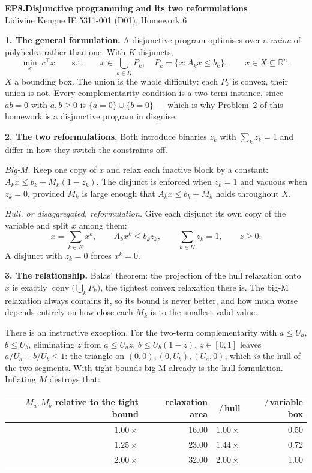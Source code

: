 \documentclass[10pt]{article}
\DeclareMathOperator{\conv}{conv}
\newcommand{\T}{^{\!\top}}
\begin{document}
{\large\bfseries EP8.\quad Disjunctive programming and its two reformulations}\\[1pt]
{\small Lidivine Kengne \quad\textbar\quad IE 5311-001 (D01), Homework 6}
\vspace{0.3em}

\textbf{1. The general formulation.}
A disjunctive program optimises over a \emph{union} of polyhedra rather
than one. With $K$ disjuncts,
\[
  \min_{x}\; c\T x
  \qquad\text{s.t.}\qquad
  x \in \bigcup_{k \in K} P_k, \quad P_k = \{x : A_k x \le b_k\},
  \qquad x \in X \subseteq \mathbb{R}^n,
\]
$X$ a bounding box. The union is the whole difficulty: each $P_k$ is
convex, their union is not. Every complementarity condition is a
two-term instance, since $ab = 0$ with $a,b \ge 0$ is
$\{a = 0\} \cup \{b = 0\}$ --- which is why Problem~2 of this homework
is a disjunctive program in disguise.

\textbf{2. The two reformulations.}
Both introduce binaries $z_k$ with $\sum_k z_k = 1$ and differ in how
they switch the constraints off.

\emph{Big-M.} Keep one copy of $x$ and relax each inactive block by a
constant: $A_k x \le b_k + M_k(1 - z_k)$. The disjunct is enforced when
$z_k = 1$ and vacuous when $z_k = 0$, provided $M_k$ is large enough
that $A_k x \le b_k + M_k$ holds throughout $X$.

\emph{Hull, or disaggregated, reformulation.} Give each disjunct its
own copy of the variable and split $x$ among them:
\[
  x = \sum_{k \in K} x^k, \qquad
  A_k x^k \le b_k z_k, \qquad
  \sum_{k \in K} z_k = 1, \qquad z \ge 0 .
\]
A disjunct with $z_k = 0$ forces $x^k = 0$.

\textbf{3. The relationship.}
Balas' theorem: the projection of the hull relaxation onto $x$ is
exactly $\conv\bigl(\bigcup_k P_k\bigr)$, the tightest convex
relaxation there is. The big-M relaxation always contains it, so its
bound is never better, and how much worse depends entirely on how close
each $M_k$ is to the smallest valid value.

There is an instructive exception. For the two-term complementarity
with $a \le U_a$, $b \le U_b$, eliminating $z$ from $a \le U_a z$,
$b \le U_b(1-z)$, $z \in [0,1]$ leaves $a/U_a + b/U_b \le 1$: the
triangle on $(0,0),(0,U_b),(U_a,0)$, which \emph{is} the hull of the
two segments. With tight bounds big-M already is the hull formulation.
Inflating $M$ destroys that:

\begin{center}\footnotesize
\setlength{\tabcolsep}{8pt}
\begin{tabular}{@{}rrrr@{}}
\toprule
$M_a, M_b$ relative to the tight bound & relaxation area
  & $/\,$hull & $/\,$variable box\\
\midrule
$1.00\times$ & 16.00 & $1.00\times$ & 0.50\\
$1.25\times$ & 23.00 & $1.44\times$ & 0.72\\
$2.00\times$ & 32.00 & $2.00\times$ & 1.00\\[-1pt]
\bottomrule
\end{tabular}
\end{center}
\end{document}
